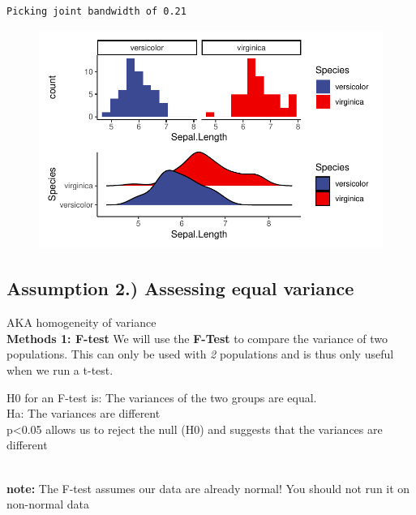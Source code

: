 \documentclass[
  letterpaper,
  DIV=11,
  numbers=noendperiod]{scrartcl}
\begin{document}
\begin{verbatim}
Picking joint bandwidth of 0.21
\end{verbatim}

\begin{figure}[H]

{\centering \includegraphics{t_test_files/figure-pdf/unnamed-chunk-8-1.pdf}

}

\end{figure}

\hypertarget{assumption-2.-assessing-equal-variance}{%
\subsection{\texorpdfstring{\textbf{Assumption 2.) Assessing equal
variance}}{Assumption 2.) Assessing equal variance}}\label{assumption-2.-assessing-equal-variance}}

AKA homogeneity of variance\\

\textbf{Methods 1: F-test} We will use the \textbf{F-Test} to compare
the variance of two populations. This can only be used with \emph{2}
populations and is thus only useful when we run a t-test.

H0 for an F-test is: The variances of the two groups are equal.\\
Ha: The variances are different\\
p\textless0.05 allows us to reject the null (H0) and suggests that the
variances are different\\
\strut \\
\textbf{note:} The F-test assumes our data are already normal! You
should not run it on non-normal data
\end{document}
